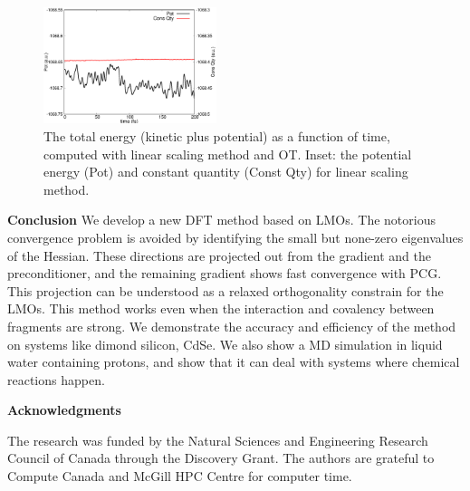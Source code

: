 \documentclass[aps,prl,twocolumn,reprint,amsmath,amssymb]{revtex4-1}
\begin{document}
\begin{figure}
\includegraphics[width=0.45\textwidth]{const}
\caption{The total energy (kinetic plus potential) as a function of time, computed with linear scaling method and OT. Inset: the potential energy (Pot) and constant quantity (Const Qty) for linear scaling method.}
\label{fig:md}
\end{figure}

\textbf{Conclusion} We develop a new DFT method based on LMOs. The notorious convergence problem is avoided by identifying the small but none-zero eigenvalues of the Hessian. These directions are projected out from the gradient and the preconditioner, and the remaining gradient shows fast convergence with PCG. This projection can be understood as a relaxed orthogonality constrain for the LMOs. This method works even when the interaction and covalency between fragments are strong. We demonstrate the accuracy and efficiency of the method on systems like dimond silicon, CdSe. We also show a MD simulation in liquid water containing protons, and show that it can deal with systems where chemical reactions happen.


\textbf{Acknowledgments} 

The research was funded by the Natural Sciences and Engineering Research Council of Canada through the Discovery Grant. The authors are grateful to Compute Canada and McGill HPC Centre for computer time.


\end{document}
